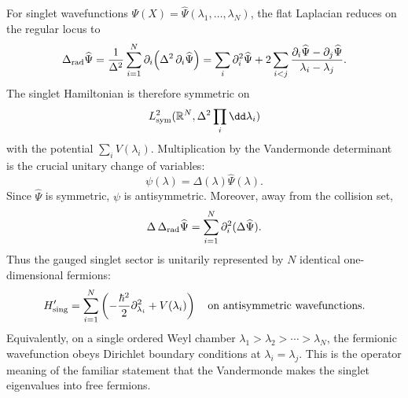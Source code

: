 For singlet wavefunctions
\(\Psi(X)=\widehat\Psi(\lambda_1,\ldots,\lambda_N)\), the flat Laplacian
reduces on the regular locus to
\begin{equation}
  \Delta_{\rm rad}\widehat\Psi
  =
  \frac1{\Delta^2}
  \sum_{i=1}^N
  \partial_i\!\left(\Delta^2\,\partial_i\widehat\Psi\right)
  =
  \sum_i\partial_i^2\widehat\Psi
  +
  2\sum_{i<j}
  \frac{\partial_i\widehat\Psi-\partial_j\widehat\Psi}
       {\lambda_i-\lambda_j}.
  \label{eq:matrix-qm-radial-laplacian}
\end{equation}
The singlet Hamiltonian is therefore symmetric on
\[
  L^2_{\rm sym}(\mathbb R^N,\Delta^2\prod_i\dd\lambda_i)
\]
with the potential \(\sum_i V(\lambda_i)\).  Multiplication by the
Vandermonde determinant is the crucial unitary change of variables:
\begin{equation}
  \psi(\lambda)=\Delta(\lambda)\widehat\Psi(\lambda).
  \label{eq:matrix-qm-vandermonde-wavefunction-map}
\end{equation}
Since \(\widehat\Psi\) is symmetric, \(\psi\) is antisymmetric.  Moreover,
away from the collision set,
\begin{equation}
  \Delta\,
  \Delta_{\rm rad}\widehat\Psi
  =
  \sum_{i=1}^N\partial_i^2(\Delta\widehat\Psi).
  \label{eq:matrix-qm-vandermonde-free-fermion-identity}
\end{equation}
Thus the gauged singlet sector is unitarily represented by \(N\) identical
one-dimensional fermions:
\begin{equation}
  H_{\rm sing}'
  =
  \sum_{i=1}^N
  \left(
    -\frac{\hbar^2}{2}\partial_{\lambda_i}^2+V(\lambda_i)
  \right)
  \quad
  \text{on antisymmetric wavefunctions.}
  \label{eq:matrix-qm-singlet-free-fermion-hamiltonian}
\end{equation}
Equivalently, on a single ordered Weyl chamber
\(\lambda_1>\lambda_2>\cdots>\lambda_N\), the fermionic wavefunction obeys
Dirichlet boundary conditions at \(\lambda_i=\lambda_j\).  This is the
operator meaning of the familiar statement that the Vandermonde makes the
singlet eigenvalues into free fermions.

